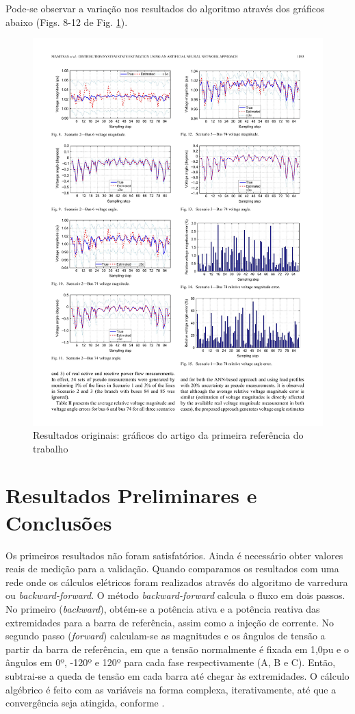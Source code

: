 \documentclass{IEEEtran}
\begin{document}
Pode-se observar a variação nos resultados do algoritmo através dos gráficos abaixo (Figs. 8-12 de Fig. \ref{topologia_full}).
\begin{figure}
	\centering
	\includegraphics{topologia_full.pdf}
	\caption{Resultados originais: gráficos do artigo da primeira referência do trabalho}
	\label{topologia_full}
\end{figure}

\section{Resultados Preliminares e Conclusões}
Os primeiros resultados não foram satisfatórios. Ainda é necessário obter valores reais de medição para a validação. Quando comparamos os resultados com uma rede onde os cálculos elétricos foram realizados através do algoritmo de varredura ou \textit{backward-forward}. O método \textit{backward-forward} calcula o fluxo em dois passos. No primeiro (\textit{backward}), obtém-se a potência ativa e a potência reativa das extremidades para a barra de referência, assim como a injeção de corrente. No segundo passo (\textit{forward}) calculam-se as magnitudes e os ângulos de tensão a partir da barra de referência, em que a tensão normalmente é fixada em 1,0pu e o ângulos em 0º, -120º e 120º para cada fase respectivamente (A, B e C). 
Então, subtrai-se a queda de tensão em cada barra até chegar às extremidades. O cálculo algébrico é feito com as variáveis na forma complexa, iterativamente, até que a convergência seja atingida, conforme \cite{zimmerman1995comprehensive}.
\end{document}
